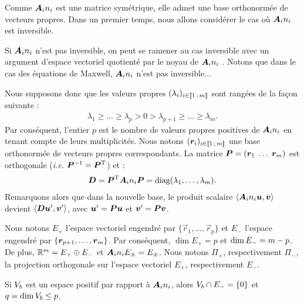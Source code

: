 Comme ${\bm{A}_{i}n_{i}}$ est une matrice symétrique,
elle admet une base orthonormée de vecteurs propres.
Dans un premier temps, nous allons considérer le cas où ${\bm{A}_{i}n_{i}}$
est inversible.

Si ${\bm{A}_{i}n_{i}}$ n'est pas inversible, on peut se ramener
au cas inversible avec un argument d'espace vectoriel quotienté par le noyau
de ${\bm{A}_{i}n_{i}}$ \cite{existence_solution_rauch}. Notons que dans le cas des équations de Maxwell, ${\bm{A}_{i}n_{i}}$ n'est pas inversible...

Nous supposons donc que les valeurs propres
$(\lambda_i)_{i \in \lbrack\!\lbrack1\,;\,m\rbrack\!\rbrack}$ sont rangées de la façon suivante :
\begin{align}
	\lambda_1 \ge \ldots \ge \lambda_p > 0 >
	\lambda_{p+1} \ge \ldots \ge \lambda_m .
\end{align}
Par conséquent, l'entier $p$ est le nombre de valeurs propres positives
de ${\bm{A}_{i}n_{i}}$ en tenant compte de leurs multiplicités.
Nous notons $(\bm{r}_i)_{i \in \lbrack\!\lbrack1\,;\,m\rbrack\!\rbrack}$ une base orthonormée
de vecteurs propres correspondants.
La matrice $\bm{P} = (\bm{r}_1 \; \ldots \; \bm{r}_m)$ est orthogonale
(\textit{i.e.} $\bm{P}^{-1} = \bm{P}^{\mathrm{T}}$) et :
\begin{align}
	\bm{D} = \bm{P}^{\mathrm{T}} {\bm{A}_{i}n_{i}} \bm{P} =
	\mathrm{diag}(\lambda_1 , \ldots , \lambda_m) .
\end{align}
Remarquons alors que dans la nouvelle base, le produit scalaire
$\left\langle {\bm{A}_{i}n_{i}} \bm{u} , \bm{v} \right\rangle$
devient $\left\langle \bm{D} \bm{u}' , \bm{v}' \right\rangle$,
avec $\bm{u}' = \bm{P} \bm{u}$ et $\bm{v}' = \bm{P} \bm{v}$.

Nous notons $E_{+}$ l'espace vectoriel engendré par
$\lbrace \Vec{r}_1 , \ldots , \Vec{r}_p \rbrace$ et $E_{-}$
l'espace engendré par $\lbrace \bm{r}_{p+1} , \ldots , \bm{r}_m \rbrace$.
Par conséquent, $\dim E_{+} = p$ et $\dim E_{-} = m - p$.
De plus, $\mathbb{R}^{m} = E_{+} \oplus E_{-}$
et ${\bm{A}_{i}n_{i}} E_{\pm} = E_{\pm}$.
Nous notons $\Pi_{+}$, respectivement $\Pi_{-}$,
la projection orthogonale sur l'espace vectoriel $E_{+}$,
respectivement $E_{-}$.


\begin{lemma} \label{lem:cnd_dim}
	Si $V_b$ est un espace positif par rapport à ${\bm{A}_{i}n_{i}}$,
	alors $V_b \cap E_{-} = \lbrace 0 \rbrace$
	et $q = \dim V_b \le p$.
\end{lemma}

